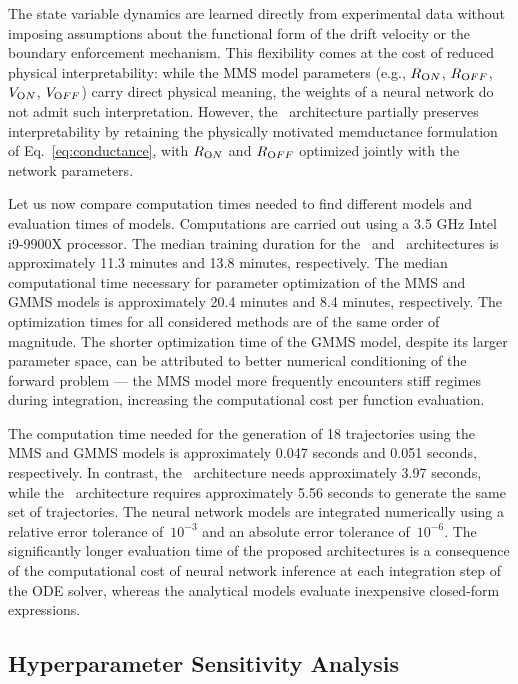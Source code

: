 \documentclass{ieeeaccess}
\begin{document}
The state variable dynamics are learned directly from experimental data without imposing assumptions about the functional form of the drift velocity or the boundary enforcement mechanism. This flexibility comes at the cost of reduced physical interpretability: while the MMS model parameters (e.g., \(R_{\text ON}\), \(R_{\text OFF}\), \(V_{\text ON}\), \(V_{\text OFF}\)) carry direct physical meaning, the weights of a neural network do not admit such interpretation. However, the \MemODEOne\ architecture partially preserves interpretability by retaining the physically motivated memductance formulation of Eq.~\eqref{eq:conductance}, with \(R_{\text ON}\) and \(R_{\text OFF}\) optimized jointly with the network parameters.



Let us now compare computation times needed to find different models and evaluation times of models.
Computations are carried out using a 3.5 GHz Intel i9-9900X processor.
The median training duration for the \MemODEOne\ and \MemODETwo\ architectures is approximately 11.3 minutes and 13.8 minutes, respectively. 
The median computational time necessary for parameter optimization of the MMS and GMMS models is approximately 20.4 minutes and 8.4 minutes, respectively. 
The optimization times for all considered methods are of the same order of magnitude. The shorter optimization time of the GMMS model, despite its larger parameter space, can be attributed to better numerical conditioning of the forward problem --- the MMS model more frequently encounters stiff regimes during integration, increasing the computational cost per function evaluation.



The computation time needed for the generation of 18 trajectories using the MMS and GMMS models is approximately 0.047 seconds and 0.051 seconds, respectively. In contrast, the \MemODETwo\ architecture needs approximately 3.97 seconds, while the \MemODEOne\ architecture requires approximately 5.56 seconds to generate the same set of trajectories. The neural network models are integrated numerically using a relative error tolerance of~\(10^{-3}\) and an absolute error tolerance of~\(10^{-6}\). The significantly longer evaluation time of the proposed architectures is a consequence of the computational cost of neural network inference at each integration step of the ODE solver, whereas the analytical models evaluate inexpensive closed-form expressions.

\subsection{Hyperparameter Sensitivity Analysis}
\end{document}

